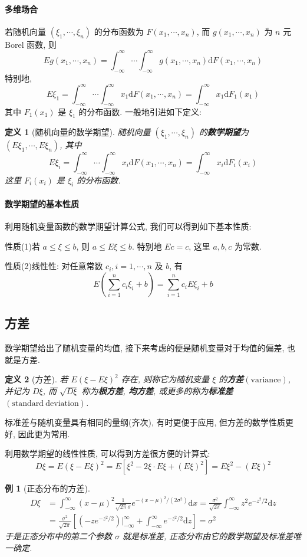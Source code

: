 \documentclass[12pt,a4paper]{article}
\newtheorem{definition}{定义}[subsection] %
\newtheorem{example}{例}[subsection] %
\begin{document}
\paragraph{多维场合}
若随机向量 $(\xi_1, \cdots, \xi_n)$ 的分布函数为 $F(x_1, \cdots, x_n)$, 而 $g(x_1, \cdots, x_n)$ 为 $n$ 元 $\mathrm{Borel}$ 函数, 则 
\[Eg(x_1, \cdots, x_n) = \int_{-\infty}^{\infty} \cdots \int_{-\infty}^{\infty} g(x_1, \cdots, x_n) \mathrm{d} F(x_1, \cdots, x_n)\]
特别地, \[ E\xi_1 = \int_{-\infty}^{\infty} \cdots \int_{-\infty}^{\infty} x_1 \mathrm{d}F(x_1, \cdots, x_n) = \int_{-\infty}^{\infty} x_1 \mathrm{d}F_1(x_1)\]
其中 $F_1(x_1)$ 是 $\xi_1$ 的分布函数. 一般地引进如下定义:
\begin{definition}[随机向量的数学期望]
    随机向量 $(\xi_1, \cdots, \xi_n)$ 的\textbf{数学期望}为 $(E\xi_1, \cdots, E\xi_n)$, 其中
    \[ E\xi_i = \int_{-\infty}^{\infty} \cdots \int_{-\infty}^{\infty} x_i \mathrm{d}F(x_1, \cdots, x_n) = \int_{-\infty}^{\infty} x_i \mathrm{d}F_i(x_i)\]
    这里 $F_i(x_i)$ 是 $\xi_i$ 的分布函数.
\end{definition}

\paragraph{数学期望的基本性质}
利用随机变量函数的数学期望计算公式, 我们可以得到如下基本性质:

性质(1)\quad 若 $a \leq \xi \leq b$, 则 $a \leq E\xi \leq b$. 特别地 $Ec = c$, 这里 $a,b,c$ 为常数.

性质(2)\quad 线性性: 对任意常数 $c_i,i = 1,\cdots,n$ 及 $b$, 有 \[E(\sum\limits_{i=1}^{n}c_i \xi_i + b) = \sum\limits_{i=1}^{n}c_i E\xi_i + b\]
\subsection{方差}
数学期望给出了随机变量的均值, 接下来考虑的便是随机变量对于均值的偏差, 也就是方差.
\begin{definition}[方差]
    若 $E(\xi - E\xi)^2$ 存在, 则称它为随机变量 $\xi$ 的\textbf{方差}$(\mathrm{variance})$, 并记为 $D\xi$, 
    而 $\sqrt{D\xi}$ 称为\textbf{根方差}, \textbf{均方差}, 或更多的称为\textbf{标准差}$(\mathrm{standard \ deviation})$.
\end{definition}
标准差与随机变量具有相同的量纲(齐次), 有时更便于应用, 但方差的数学性质更好, 因此更为常用.

利用数学期望的线性性质, 可以得到方差很方便的计算式: \[ D\xi  = E(\xi - E\xi)^2 = E[\xi^2 - 2\xi \cdot E\xi + (E\xi)^2] = E\xi^2 -(E\xi)^2 \]
\begin{example}[正态分布的方差]
    \[  \begin{aligned}
        D\xi & = \int_{-\infty}^{\infty} (x-\mu)^2 \frac{1}{\sqrt{2\pi}\sigma}e^{-(x-\mu)^2/(2\sigma^2)}\mathrm{d}x = \frac{\sigma^2}{\sqrt{2\pi}}\int_{-\infty}^{\infty}z^2 e^{-z^2/2}\mathrm{d}z\\
        & = \frac{\sigma^2}{\sqrt{2\pi}}\left[ (-ze^{-z^2/2}) \Big|^{\infty}_{-\infty} + \int_{-\infty}^{\infty}e^{-z^2/2} \mathrm{d} z \right] = \sigma^2
    \end{aligned}  \]
    于是正态分布中的第二个参数 $\sigma$ 就是标准差, 正态分布由它的数学期望及标准差唯一确定.
\end{example}
\end{document}
